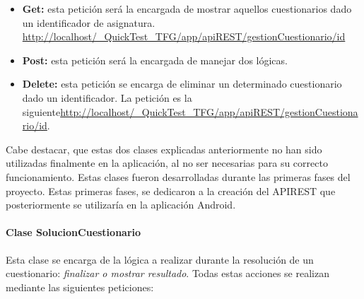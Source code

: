 \begin{itemize}

	\item \textbf{Get:} esta petición será la encargada de mostrar aquellos cuestionarios dado un identificador de asignatura. \url{http://localhost/_QuickTest_TFG/app/apiREST/gestionCuestionario/id}
	\item \textbf{Post:} esta petición será la encargada de manejar dos lógicas.
	
	\item \textbf{Delete:} esta petición se encarga de eliminar un determinado cuestionario dado un identificador. La petición es la siguiente\url{http://localhost/_QuickTest_TFG/app/apiREST/gestionCuestionario/id}.

\end{itemize}


Cabe destacar, que estas dos clases explicadas anteriormente no han sido utilizadas finalmente en la aplicación, al no ser necesarias para su correcto funcionamiento. Estas clases fueron desarrolladas durante las primeras fases del proyecto. Estas primeras fases, se dedicaron a la creación del APIREST que posteriormente se utilizaría en la aplicación Android.

\paragraph{Clase SolucionCuestionario}

Esta clase se encarga de la lógica a realizar durante la resolución de un cuestionario: \emph{finalizar o mostrar resultado}.
Todas estas acciones se realizan mediante las siguientes peticiones:

